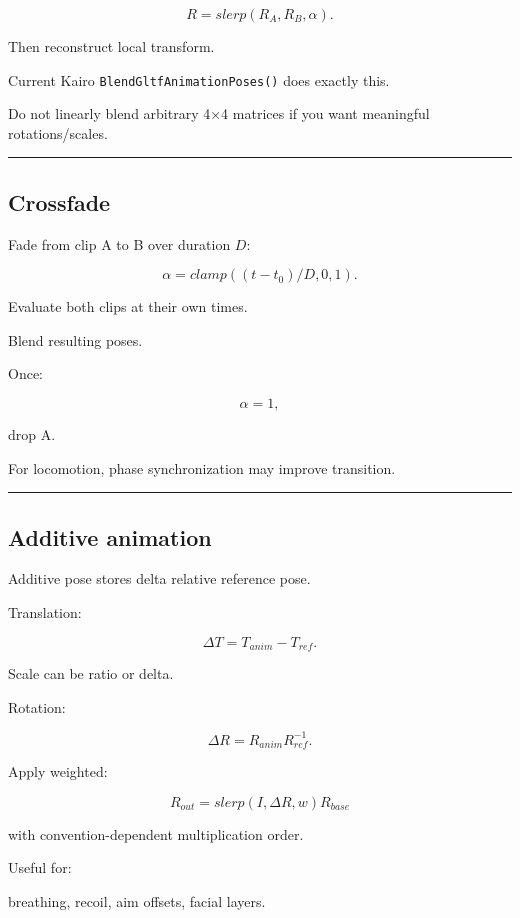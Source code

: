 \[
R=
slerp(R_A,R_B,\alpha).
\]

Then reconstruct local transform.

Current Kairo \texttt{BlendGltfAnimationPoses()} does exactly this.

Do not linearly blend arbitrary 4×4 matrices if you want meaningful rotations/scales.

\begin{center}\rule{0.5\linewidth}{0.5pt}\end{center}

\subsection{Crossfade}\label{04-visual-computing-ii-ch041-crossfade}

Fade from clip A to B over duration \(D\):

\[
\alpha=
clamp(
(t-t_0)/D,
0,1
).
\]

Evaluate both clips at their own times.

Blend resulting poses.

Once:

\[
\alpha=1,
\]

drop A.

For locomotion, phase synchronization may improve transition.

\begin{center}\rule{0.5\linewidth}{0.5pt}\end{center}

\subsection{Additive animation}\label{04-visual-computing-ii-ch041-additive-animation}

Additive pose stores delta relative reference pose.

Translation:

\[
\Delta T=
T_{anim}-T_{ref}.
\]

Scale can be ratio or delta.

Rotation:

\[
\Delta R=
R_{anim}R_{ref}^{-1}.
\]

Apply weighted:

\[
R_{out}
=
slerp(
I,
\Delta R,
w
)
R_{base}
\]

with convention-dependent multiplication order.

Useful for:

breathing, recoil, aim offsets, facial layers.

